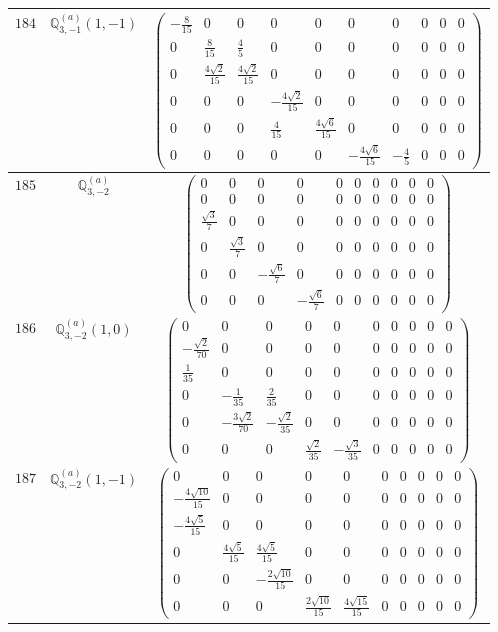 \documentclass[fleqn,8pt,landscape]{jsarticle}
\begin{document}
\begin{center}
\begin{longtable}{ccc}
$ 184 $ & $ \mathbb{Q}_{3,-1}^{(a)}(1,-1) $ & $ \begin{pmatrix} - \frac{8}{15} & 0 & 0 & 0 & 0 & 0 & 0 & 0 & 0 & 0 \\ 0 & \frac{8}{15} & \frac{4}{5} & 0 & 0 & 0 & 0 & 0 & 0 & 0 \\ 0 & \frac{4 \sqrt{2}}{15} & \frac{4 \sqrt{2}}{15} & 0 & 0 & 0 & 0 & 0 & 0 & 0 \\ 0 & 0 & 0 & - \frac{4 \sqrt{2}}{15} & 0 & 0 & 0 & 0 & 0 & 0 \\ 0 & 0 & 0 & \frac{4}{15} & \frac{4 \sqrt{6}}{15} & 0 & 0 & 0 & 0 & 0 \\ 0 & 0 & 0 & 0 & 0 & - \frac{4 \sqrt{6}}{15} & - \frac{4}{5} & 0 & 0 & 0 \end{pmatrix} $ \\ \hline
$ 185 $ & $ \mathbb{Q}_{3,-2}^{(a)} $ & $ \begin{pmatrix} 0 & 0 & 0 & 0 & 0 & 0 & 0 & 0 & 0 & 0 \\ 0 & 0 & 0 & 0 & 0 & 0 & 0 & 0 & 0 & 0 \\ \frac{\sqrt{3}}{7} & 0 & 0 & 0 & 0 & 0 & 0 & 0 & 0 & 0 \\ 0 & \frac{\sqrt{3}}{7} & 0 & 0 & 0 & 0 & 0 & 0 & 0 & 0 \\ 0 & 0 & - \frac{\sqrt{6}}{7} & 0 & 0 & 0 & 0 & 0 & 0 & 0 \\ 0 & 0 & 0 & - \frac{\sqrt{6}}{7} & 0 & 0 & 0 & 0 & 0 & 0 \end{pmatrix} $ \\ \hline
$ 186 $ & $ \mathbb{Q}_{3,-2}^{(a)}(1,0) $ & $ \begin{pmatrix} 0 & 0 & 0 & 0 & 0 & 0 & 0 & 0 & 0 & 0 \\ - \frac{\sqrt{2}}{70} & 0 & 0 & 0 & 0 & 0 & 0 & 0 & 0 & 0 \\ \frac{1}{35} & 0 & 0 & 0 & 0 & 0 & 0 & 0 & 0 & 0 \\ 0 & - \frac{1}{35} & \frac{2}{35} & 0 & 0 & 0 & 0 & 0 & 0 & 0 \\ 0 & - \frac{3 \sqrt{2}}{70} & - \frac{\sqrt{2}}{35} & 0 & 0 & 0 & 0 & 0 & 0 & 0 \\ 0 & 0 & 0 & \frac{\sqrt{2}}{35} & - \frac{\sqrt{3}}{35} & 0 & 0 & 0 & 0 & 0 \end{pmatrix} $ \\ \hline
$ 187 $ & $ \mathbb{Q}_{3,-2}^{(a)}(1,-1) $ & $ \begin{pmatrix} 0 & 0 & 0 & 0 & 0 & 0 & 0 & 0 & 0 & 0 \\ - \frac{4 \sqrt{10}}{15} & 0 & 0 & 0 & 0 & 0 & 0 & 0 & 0 & 0 \\ - \frac{4 \sqrt{5}}{15} & 0 & 0 & 0 & 0 & 0 & 0 & 0 & 0 & 0 \\ 0 & \frac{4 \sqrt{5}}{15} & \frac{4 \sqrt{5}}{15} & 0 & 0 & 0 & 0 & 0 & 0 & 0 \\ 0 & 0 & - \frac{2 \sqrt{10}}{15} & 0 & 0 & 0 & 0 & 0 & 0 & 0 \\ 0 & 0 & 0 & \frac{2 \sqrt{10}}{15} & \frac{4 \sqrt{15}}{15} & 0 & 0 & 0 & 0 & 0 \end{pmatrix} $ \\ \hline

\end{longtable}
\end{center}
\end{document}
